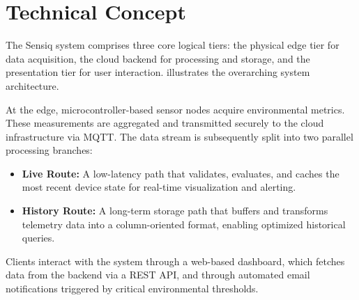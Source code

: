 \section{Technical Concept}\label{sec:technical_concept}

The Sensiq system comprises three core logical tiers:
the physical edge tier for data acquisition,
the cloud backend for processing and storage,
and the presentation tier for user interaction.
 illustrates the overarching system architecture.


At the edge, microcontroller-based sensor nodes acquire environmental metrics.
These measurements are aggregated and transmitted securely to the cloud infrastructure via MQTT.
The data stream is subsequently split into two parallel processing branches:

\begin{itemize}
	\item \textbf{Live Route:} A low-latency path that validates, evaluates, and caches
	      the most recent device state for real-time visualization and alerting.
	\item \textbf{History Route:} A long-term storage path that buffers and transforms
	      telemetry data into a column-oriented format, enabling optimized historical queries.
\end{itemize}

Clients interact with the system through a web-based dashboard, which fetches data from
the backend via a REST API, and through automated email notifications triggered by critical
environmental thresholds.



